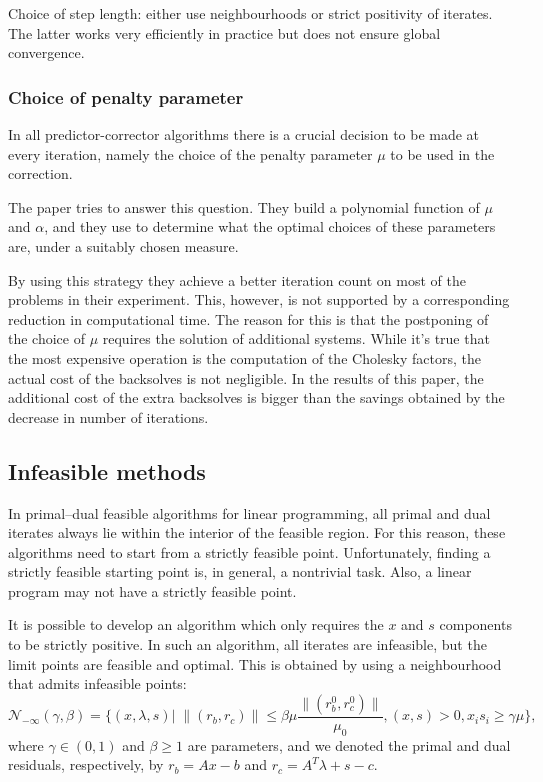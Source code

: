 \hrulefill

Choice of step length: either use neighbourhoods or strict 
positivity of iterates. The latter works very efficiently 
in practice but does not ensure global convergence.

%
%
\subsubsection{Choice of penalty parameter}

In all predictor-corrector algorithms there is a crucial decision 
to be made at every iteration, namely the choice of the penalty 
parameter $\mu$ to be used in the correction.

The paper \cite{VillasBoasPerin} tries to answer this question. 
They build a polynomial function of $\mu$ and $\alpha$, and they 
use to determine what the optimal choices of these parameters are, 
under a suitably chosen measure.

By using this strategy they achieve a better iteration count on 
most of the problems in their experiment. This, however, is not 
supported by a corresponding reduction in computational time. 
The reason for this is that the postponing of the choice of $\mu$ 
requires the solution of additional systems. While it's true that 
the most expensive operation is the computation of the Cholesky 
factors, the actual cost of the backsolves is not negligible. 
In the results of this paper, the additional cost of the extra 
backsolves is bigger than the savings obtained by the decrease 
in number of iterations.

%
%
\subsection{Infeasible methods}

In primal--dual feasible algorithms for linear programming, 
all primal and dual iterates always lie within the interior 
of the feasible region. For this reason, these algorithms 
need to start from a strictly feasible point. Unfortunately, 
finding a strictly feasible starting point is, in general, 
a nontrivial task. Also, a linear program may not have a 
strictly feasible point.

It is possible to develop an algorithm which only requires 
the $x$ and $s$ components to be strictly positive. In such 
an algorithm, all iterates are infeasible, but the limit points 
are feasible and optimal. This is obtained by using a 
neighbourhood that admits infeasible points:
\[
\mathcal{N}_{-\infty}(\gamma,\beta) =\{ (x,\lambda,s) | \; \|(r_b,r_c)\| \le \beta\mu \frac{\|(r_b^0,r_c^0)\|}{\mu_0}, (x,s)>0, x_is_i \ge \gamma\mu \},
\]
where $\gamma\in (0,1)$ and $\beta \ge 1$ are parameters, and 
we denoted the primal and dual residuals, respectively, by 
$r_b = Ax-b$ and $r_c = A^T\lambda+s-c$.


